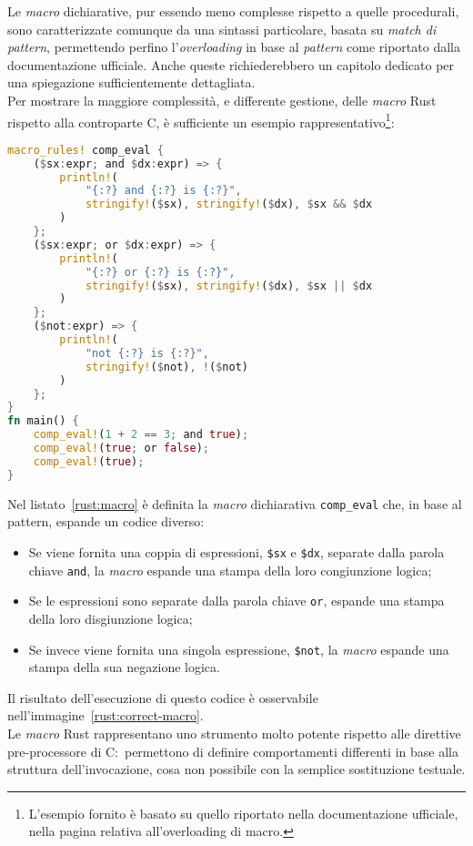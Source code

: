 Le \textit{macro} dichiarative, pur essendo meno complesse rispetto a quelle procedurali, sono caratterizzate comunque da una sintassi particolare,
basata su \textit{match di pattern}, permettendo
perfino l'\textit{overloading} in base al \textit{pattern} come riportato dalla documentazione ufficiale\cite{rust-book}. 
Anche queste richiederebbero un capitolo 
dedicato per una spiegazione sufficientemente dettagliata. \hfill
\vspace{9pt}\\
\noindent Per mostrare la maggiore complessità, e differente gestione, delle \textit{macro} Rust rispetto alla controparte C, è sufficiente un esempio rappresentativo\footnote{L'esempio fornito è basato su quello riportato nella documentazione ufficiale\cite{rust-book}, nella pagina relativa all'overloading di macro.}:
\begin{lstlisting}[language=Rust, caption={Definizione di \textit{macro} dichiarativa in Rust}, label={rust:macro}]
macro_rules! comp_eval {
    ($sx:expr; and $dx:expr) => {
        println!(
            "{:?} and {:?} is {:?}",
            stringify!($sx), stringify!($dx), $sx && $dx
        )
    };
    ($sx:expr; or $dx:expr) => {
        println!(
            "{:?} or {:?} is {:?}",
            stringify!($sx), stringify!($dx), $sx || $dx
        )
    };
    ($not:expr) => {
        println!(
            "not {:?} is {:?}",
            stringify!($not), !($not)
        )
    };
}
fn main() {
    comp_eval!(1 + 2 == 3; and true);
    comp_eval!(true; or false);
    comp_eval!(true);
}
\end{lstlisting}
Nel listato~\ref{rust:macro} è definita la \textit{macro} dichiarativa \texttt{comp\_eval} che, in base al pattern, espande un codice diverso:
\begin{itemize}
    \item Se viene fornita una coppia di espressioni, \texttt{\$sx} e \texttt{\$dx}, separate dalla parola chiave \texttt{and}, la \textit{macro} espande una stampa della loro congiunzione logica;
    \item Se le espressioni sono separate dalla parola chiave \texttt{or}, espande una stampa della loro disgiunzione logica;
    \item Se invece viene fornita una singola espressione, \texttt{\$not}, la \textit{macro} espande una stampa della sua negazione logica.
\end{itemize}
Il risultato dell'esecuzione di questo codice è osservabile nell'immagine~\ref{rust:correct-macro}. \hfill
\vspace{0pt}\\
\noindent Le \textit{macro} Rust rappresentano uno strumento molto potente rispetto alle direttive pre-processore di C:\  permettono di definire comportamenti 
differenti in base alla struttura dell'invocazione, cosa non
possibile con la semplice sostituzione testuale.

